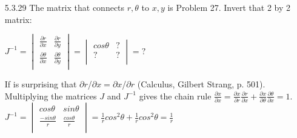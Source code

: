 \documentclass[10pt,twoside,reqno]{article}
\begin{document}
\begin{enumerate}
\vspace{3mm}
\item[5.3.29] The matrix that connects $r, \theta$ to $x, y$ is Problem 27. Invert that 2 by 2 matrix:\\
\begin{center}
$
$$
J^{-1} =
\begin{vmatrix}
\frac{\partial r}{\partial x} & \frac{\partial r}{\partial y}\\
\frac{\partial \theta}{\partial x} & \frac{\partial \theta}{\partial y}\\
\end{vmatrix}
=
\begin{vmatrix}
cos\theta & ?\\
? & ?\\
\end{vmatrix}
= ?
$$
$\\
\end{center}
If is surprising that $\partial r$/$\partial x = \partial x$/$\partial r$ (Calculus, Gilbert Strang, p. 501). Multiplying the matrices $J$ and $J^{-1}$ gives the chain rule $\frac{\partial x}{\partial x} = \frac{\partial x}{\partial r}\frac{\partial r}{\partial x} + \frac{\partial x}{\partial \theta}\frac{\partial \theta}{
\partial x} = 1$.\\
\vspace{3mm}
$
$$
J^{-1}
=
\begin{vmatrix}
cos\theta & sin \theta\\
\frac{-sin\theta}{r} & \frac{cos\theta}{r}\\
\end{vmatrix}
=
\frac{1}{r}cos^2\theta + \frac{1}{r}cos^2\theta = \frac{1}{r}
$$
$\\


\vspace{3mm}
\end{enumerate}
\end{document}
